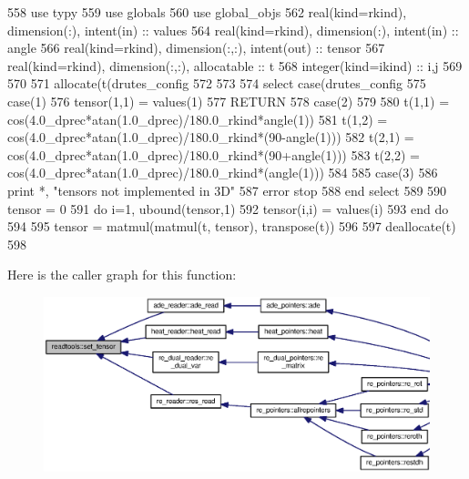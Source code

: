 \begin{DoxyCode}
558       \textcolor{keywordtype}{use }typy
559       \textcolor{keywordtype}{use }globals
560       \textcolor{keywordtype}{use }global_objs
562       \textcolor{keywordtype}{real(kind=rkind)}, \textcolor{keywordtype}{dimension(:)}, \textcolor{keywordtype}{intent(in)} :: values
564       \textcolor{keywordtype}{real(kind=rkind)}, \textcolor{keywordtype}{dimension(:)}, \textcolor{keywordtype}{intent(in)} :: angle
566       \textcolor{keywordtype}{real(kind=rkind)}, \textcolor{keywordtype}{dimension(:,:)}, \textcolor{keywordtype}{intent(out)} :: tensor
567       \textcolor{keywordtype}{real(kind=rkind)}, \textcolor{keywordtype}{dimension(:,:)}, \textcolor{keywordtype}{allocatable} :: t
568       \textcolor{keywordtype}{integer(kind=ikind)} :: i,j
569 
570 
571       \textcolor{keyword}{allocate}(t(drutes_config%
572 
573 
574       \textcolor{keywordflow}{select case}(drutes_config%
575         \textcolor{keywordflow}{case}(1)
576           tensor(1,1) = values(1)
577           \textcolor{keywordflow}{RETURN}
578         \textcolor{keywordflow}{case}(2)
579 
580           t(1,1) = cos(4.0\_dprec*atan(1.0\_dprec)/180.0\_rkind*angle(1))
581           t(1,2) = cos(4.0\_dprec*atan(1.0\_dprec)/180.0\_rkind*(90-angle(1\textcolor{comment}{)))}
582 \textcolor{comment}{          t(2,1) = cos(4.0\_dprec*atan(1.0\_dprec)/180.0\_rkind*(90+angle(1)))}
583 \textcolor{comment}{          t(2,2) = cos(4.0\_dprec*atan(1.0\_dprec)/180.0\_rkind*(angle(1)))}
584 \textcolor{comment}{}
585 \textcolor{comment}{        }\textcolor{keywordflow}{case}(3)
586           print *, \textcolor{stringliteral}{"tensors not implemented in 3D"}
587           error stop
588 \textcolor{keywordflow}{      end select}            
589 
590       tensor = 0
591       \textcolor{keywordflow}{do} i=1, ubound(tensor,1)
592         tensor(i,i) = values(i)
593 \textcolor{keywordflow}{      end do}
594 
595       tensor = matmul(matmul(t, tensor), transpose(t))
596 
597       \textcolor{keyword}{deallocate}(t)
598 
\end{DoxyCode}


Here is the caller graph for this function\+:\nopagebreak
\begin{figure}[H]
\begin{center}
\leavevmode
\includegraphics[width=350pt]{namespacereadtools_a718f41934d7cc35a0c4f8d4107a69029_icgraph}
\end{center}
\end{figure}


